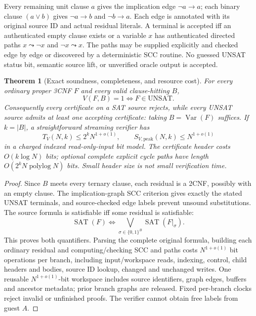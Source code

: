 \documentclass[11pt]{article}
\newtheorem{theorem}{Theorem}
\begin{document}
Every remaining unit clause $a$ gives the implication edge $\neg a\to a$; each binary clause $(a\vee b)$ gives $\neg a\to b$ and $\neg b\to a$. Each edge is annotated with its original source ID and actual residual literals. A terminal is accepted iff an authenticated empty clause exists or a variable $x$ has authenticated directed paths $x\leadsto\neg x$ and $\neg x\leadsto x$. The paths may be supplied explicitly and checked edge by edge or discovered by a deterministic SCC routine. No guessed UNSAT status bit, semantic source lift, or unverified oracle output is accepted.
\begin{theorem}[Exact soundness, completeness, and resource cost]
For every ordinary proper 3CNF $F$ and every valid clause-hitting $B$,
\[
V(F,B)=1\iff F\in\mathrm{UNSAT}.
\]
Consequently every certificate on a SAT source rejects, while every UNSAT source admits at least one accepting certificate: taking $B=\operatorname{Var}(F)$ suffices. If $k=|B|$, a straightforward streaming verifier has
\[
T_V(N,k)\le 2^kN^{1+o(1)},\qquad
S_{V,\mathrm{peak}}(N,k)\le N^{1+o(1)}
\]
in a charged indexed read-only-input bit model. The certificate header costs $O(k\log N)$ bits; optional complete explicit cycle paths have length $O(2^kN\operatorname{polylog}N)$ bits. Small header size is not small verification time.
\end{theorem}
\begin{proof}
Since $B$ meets every ternary clause, each residual is a 2CNF, possibly with an empty clause. The implication-graph SCC criterion gives exactly the stated UNSAT terminals, and source-checked edge labels prevent unsound substitutions. The source formula is satisfiable iff some residual is satisfiable:
\[
\operatorname{SAT}(F)\Longleftrightarrow
\bigvee_{\sigma\in\{0,1\}^B}\operatorname{SAT}(F|_\sigma).
\]
This proves both quantifiers. Parsing the complete original formula, building each ordinary residual and computing/checking SCC and paths costs $N^{1+o(1)}$ bit operations per branch, including input/workspace reads, indexing, control, child headers and bodies, source ID lookup, changed and unchanged writes. One reusable $N^{1+o(1)}$-bit workspace includes source identifiers, graph edges, buffers and ancestor metadata; prior branch graphs are released. Fixed per-branch clocks reject invalid or unfinished proofs. The verifier cannot obtain free labels from guest $A$.
\end{proof}
\end{document}

